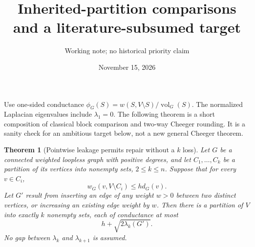 \documentclass[11pt]{article}
\title{Inherited-partition comparisons and a literature-subsumed target}
\author{Working note; no historical priority claim}
\date{November 15, 2026}
\newtheorem{theorem}{Theorem}
\newcommand{\vol}{\operatorname{vol}}
\begin{document}
\maketitle
Use one-sided conductance $\phi_G(S)=w(S,V\setminus S)/\vol_G(S)$.
The normalized Laplacian eigenvalues include $\lambda_1=0$.
The following theorem is a short composition of classical block
comparison and two-way Cheeger rounding. It is a sanity check for an
ambitious target below, not a new general Cheeger theorem.

\begin{theorem}[Pointwise leakage permits repair without a $k$ loss]
Let $G$ be a connected weighted loopless graph with positive degrees,
and let $C_1,\ldots,C_k$ be a partition of its vertices into nonempty
sets, $2\le k\le n$. Suppose that for every $v\in C_i$,
\[
 w_G(v,V\setminus C_i)\le h d_G(v).
\]
Let $G'$ result from inserting an edge of any weight $w>0$ between
two distinct vertices, or increasing an existing edge weight by $w$.
Then there is a partition of $V$ into exactly $k$ nonempty sets, each
of conductance at most
\[
 h+\sqrt{2\lambda_k(G')}.
\]
No gap between $\lambda_k$ and $\lambda_{k+1}$ is assumed.
\end{theorem}
\end{document}
